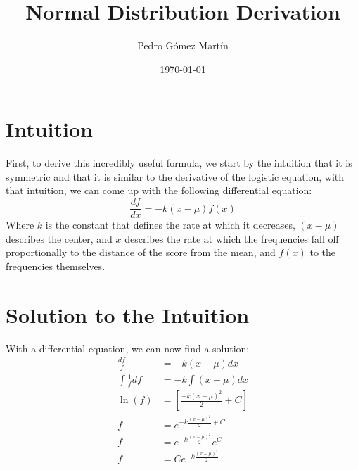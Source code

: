 \documentclass{article}
\author{Pedro G\'{o}mez Mart\'{i}n}
\date{\today}
\title{Normal Distribution Derivation}
\begin{document}
\maketitle

\section{Intuition}

First, to derive this incredibly useful formula, we start by the intuition that
it is symmetric and that it is similar to the derivative of the logistic
equation, with that intuition, we can come up with the following differential
equation:
\begin{equation}
  \label{eq:Differential equation intuition}
  \frac{df}{dx}=-k(x-\mu)f(x)
\end{equation}
Where $k$ is the constant that defines the rate at which it decreases, $(x-\mu)$
describes the center, and $x$ describes the rate at which the frequencies
fall off proportionally to the distance of the score from the mean, and $f(x)$
to the frequencies themselves.

\section{Solution to the Intuition}
With a differential equation, we can now find a solution:
\begin{align}
  \frac{df}{f}&=-k(x-\mu)dx\\
  \int\frac{1}{f}df&=-k\int (x-\mu)dx\\
  \ln (f)&=\left[ \frac{-k(x-\mu)^2}{2} +C \right]\\
  f&=e^{-k\frac{\left(x-\mu\right)^2}{2}+C}\\
  f&=e^{-k\frac{\left(x-\mu\right)^2}{2}}e^C\\
  f&=Ce^{-k\frac{\left(x-\mu\right)^2}{2}}
\end{align}
\end{document}
